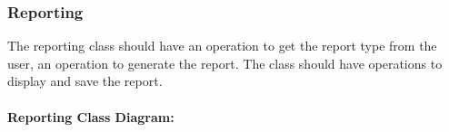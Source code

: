 \subsubsection{Reporting}
The reporting class should have an operation to get the report type from the user, an operation to generate the report. The class should have operations to display and save the report.\\ \\ 
\textbf{Reporting Class Diagram:}\\
\centerline{}


